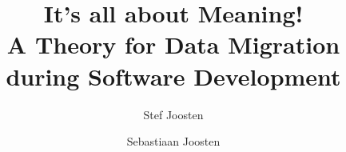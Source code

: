\documentclass{elsarticle}
\begin{document}





\title{It's all about Meaning!\\{\normalsize A Theory for Data Migration during Software Development}}
\author[ou,ordina]{Stef Joosten}
\author[umn]{Sebastiaan Joosten}
\address[ou]{Open Universiteit Nederland, Heerlen, the Netherlands}
\address[ordina]{Ordina NV, Nieuwegein, the Netherlands}
\address[umn]{University of Minnesota, Minneapolis, USA}
\end{document}
